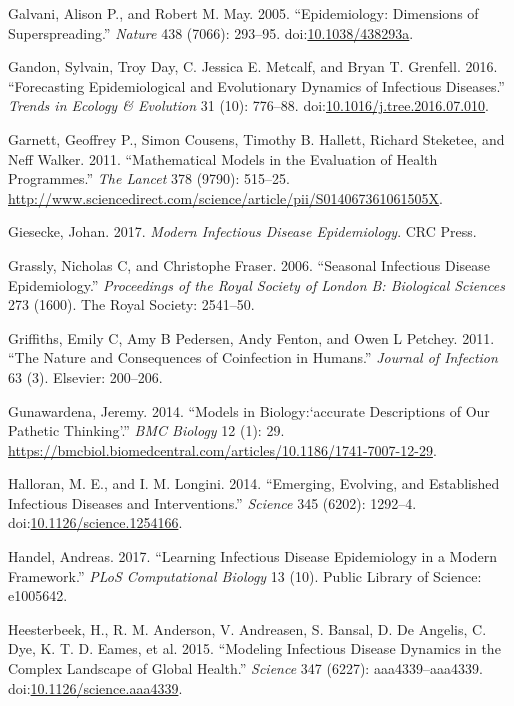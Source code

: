 \documentclass[]{book}
\theoremstyle{definition}
\theoremstyle{definition}
\theoremstyle{definition}
\theoremstyle{remark}
\begin{document}
\hypertarget{ref-galvani05}{}
Galvani, Alison P., and Robert M. May. 2005. ``Epidemiology: Dimensions
of Superspreading.'' \emph{Nature} 438 (7066): 293--95.
doi:\href{https://doi.org/10.1038/438293a}{10.1038/438293a}.

\hypertarget{ref-gandon16}{}
Gandon, Sylvain, Troy Day, C. Jessica E. Metcalf, and Bryan T. Grenfell.
2016. ``Forecasting Epidemiological and Evolutionary Dynamics of
Infectious Diseases.'' \emph{Trends in Ecology \& Evolution} 31 (10):
776--88.
doi:\href{https://doi.org/10.1016/j.tree.2016.07.010}{10.1016/j.tree.2016.07.010}.

\hypertarget{ref-garnett11}{}
Garnett, Geoffrey P., Simon Cousens, Timothy B. Hallett, Richard
Steketee, and Neff Walker. 2011. ``Mathematical Models in the Evaluation
of Health Programmes.'' \emph{The Lancet} 378 (9790): 515--25.
\url{http://www.sciencedirect.com/science/article/pii/S014067361061505X}.

\hypertarget{ref-giesecke17}{}
Giesecke, Johan. 2017. \emph{Modern Infectious Disease Epidemiology}.
CRC Press.

\hypertarget{ref-grassly06}{}
Grassly, Nicholas C, and Christophe Fraser. 2006. ``Seasonal Infectious
Disease Epidemiology.'' \emph{Proceedings of the Royal Society of London
B: Biological Sciences} 273 (1600). The Royal Society: 2541--50.

\hypertarget{ref-griffiths11}{}
Griffiths, Emily C, Amy B Pedersen, Andy Fenton, and Owen L Petchey.
2011. ``The Nature and Consequences of Coinfection in Humans.''
\emph{Journal of Infection} 63 (3). Elsevier: 200--206.

\hypertarget{ref-gunawardena14}{}
Gunawardena, Jeremy. 2014. ``Models in Biology:`accurate Descriptions of
Our Pathetic Thinking'.'' \emph{BMC Biology} 12 (1): 29.
\url{https://bmcbiol.biomedcentral.com/articles/10.1186/1741-7007-12-29}.

\hypertarget{ref-halloran14}{}
Halloran, M. E., and I. M. Longini. 2014. ``Emerging, Evolving, and
Established Infectious Diseases and Interventions.'' \emph{Science} 345
(6202): 1292--4.
doi:\href{https://doi.org/10.1126/science.1254166}{10.1126/science.1254166}.

\hypertarget{ref-handel17}{}
Handel, Andreas. 2017. ``Learning Infectious Disease Epidemiology in a
Modern Framework.'' \emph{PLoS Computational Biology} 13 (10). Public
Library of Science: e1005642.

\hypertarget{ref-heesterbeek15}{}
Heesterbeek, H., R. M. Anderson, V. Andreasen, S. Bansal, D. De Angelis,
C. Dye, K. T. D. Eames, et al. 2015. ``Modeling Infectious Disease
Dynamics in the Complex Landscape of Global Health.'' \emph{Science} 347
(6227): aaa4339--aaa4339.
doi:\href{https://doi.org/10.1126/science.aaa4339}{10.1126/science.aaa4339}.
\end{document}
